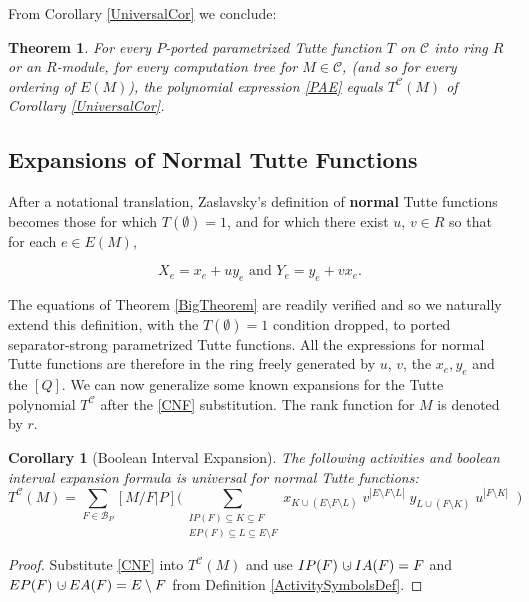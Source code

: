 \documentclass[12pt,leqno]{amsart}
\newtheorem{cor}[lem]{Corollary}
\newtheorem{thm}[lem]{Theorem}
\theoremstyle{remark}
\newcommand{\dunion}
{\mbox{\hbox{\hskip6pt$\cdot$\hskip-5.50pt$\cup$\hskip2pt}}}
\newcommand{\Card}[1]{\ensuremath{{\left|#1\right|}}}
\begin{document}
From Corollary \ref{UniversalCor} we conclude:
\begin{thm}
\label{ActivitiesTheorem}
For every $P$-ported parametrized Tutte function $T$ 
on $\mathcal{C}$ into 
ring $R$ or an $R$-module,
for every computation tree for $M\in\mathcal{C}$,
(and so for every ordering of $E(M)$), 
the polynomial expression \eqref{PAE} equals 
$T^{\mathcal{C}}(M)$ of Corollary \ref{UniversalCor}.
\end{thm}


\subsection{Expansions of Normal Tutte Functions}
\label{NormalSubSec}
After a notational translation, 
Zaslavsky's \cite{MR93a:05047} definition of {\bf normal} Tutte 
functions becomes
those for which $T(\emptyset)=1$, and for which there exist
$u$, $v\in R$ so that for each $e\in E(M)$,

\begin{equation}
\tag{CNF}
\label{CNF}
X_e = x_e + uy_e \text{ and } Y_e = y_e + vx_e.
\end{equation}

The equations of
Theorem \ref{BigTheorem} are readily verified and
so we naturally extend this definition, with the
$T(\emptyset)=1$ condition dropped, to 
ported separator-strong parametrized Tutte functions.
All the expressions for normal Tutte
functions are therefore in the ring freely generated by
$u$, $v$, the $x_e, y_e$ and the $[Q]$.
We can now generalize some known 
expansions for the Tutte polynomial $T^{\mathcal{C}}$
after the \eqref{CNF} substitution.
The rank function for $M$ is denoted by $r$.


\begin{cor}[Boolean Interval Expansion]
\label{NormalActProp}
The following activities and boolean interval expansion formula
is universal for normal Tutte functions:
\[
T^{\mathcal{C}}(M)=
\sum_{F\in \mathcal{B}_P}[M/F|P]
\Big(
\sum_{\substack{
       IP(F)\subseteq K \subseteq F\\
       EP(F)\subseteq L \subseteq E\setminus F
      }}
 x_{K\cup (E\setminus F\setminus L)}\;
 v^{\Card{E\setminus F\setminus L}}\;
 y_{L\cup (F\setminus K)}\;
 u^{\Card{F\setminus K}}\;\;
\Big)
\]
\end{cor}

\begin{proof} 
Substitute 
\eqref{CNF} 
into $T^{\mathcal{C}}(M)$
and use
$IP(F)\dunion IA(F) =F$ and 
$EP(F)\dunion EA(F)=E\setminus F$
from
Definition \ref{ActivitySymbolsDef}.
\end{proof}
\end{document}
